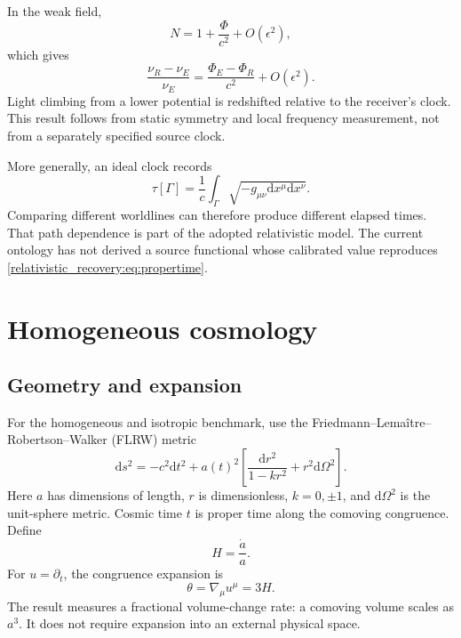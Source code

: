 \documentclass[11pt,oneside]{report}
\newcommand{\Ph}{\Phi}
\newcommand{\dd}{\mathrm d}
\theoremstyle{remark}
\numberwithin{definition}{chapter}
\numberwithin{proposition}{chapter}
\numberwithin{remark}{chapter}
\begin{document}
In the weak field,
\begin{equation}
N=1+\frac{\Ph}{c^2}+O(\epsilon^2),
\label{relativistic_recovery:eq:lapseweakfield}
\end{equation}
which gives
\begin{equation}
\frac{\nu_R-\nu_E}{\nu_E}=\frac{\Ph_E-\Ph_R}{c^2}+O(\epsilon^2).
\label{relativistic_recovery:eq:weakredshift}
\end{equation}
Light climbing from a lower potential is redshifted relative to the receiver's clock. This result follows from static symmetry and local frequency measurement, not from a separately specified source clock.

More generally, an ideal clock records
\begin{equation}
\tau[\Gamma]=\frac1c\int_\Gamma\sqrt{-g_{\mu\nu}\dd x^\mu\dd x^\nu}.
\label{relativistic_recovery:eq:propertime}
\end{equation}
Comparing different worldlines can therefore produce different elapsed times. That path dependence is part of the adopted relativistic model. The current ontology has not derived a source functional whose calibrated value reproduces \eqref{relativistic_recovery:eq:propertime}.

\section{Homogeneous cosmology}
\subsection{Geometry and expansion}
For the homogeneous and isotropic benchmark, use the Friedmann--Lema\^itre--Robertson--Walker (FLRW) metric
\begin{equation}
\dd s^2=-c^2\dd t^2+a(t)^2\left[
\frac{\dd r^2}{1-kr^2}+r^2\dd\Omega^2\right].
\label{relativistic_recovery:eq:flrwmetric}
\end{equation}
Here $a$ has dimensions of length, $r$ is dimensionless, $k=0,\pm1$, and $\dd\Omega^2$ is the unit-sphere metric. Cosmic time $t$ is proper time along the comoving congruence. Define
\begin{equation}
H=\frac{\dot a}{a}.
\label{relativistic_recovery:eq:hubble}
\end{equation}
For $u=\partial_t$, the congruence expansion is
\begin{equation}
\theta=\nabla_\mu u^\mu=3H.
\label{relativistic_recovery:eq:theta3h}
\end{equation}
The result measures a fractional volume-change rate: a comoving volume scales as $a^3$. It does not require expansion into an external physical space.
\end{document}
